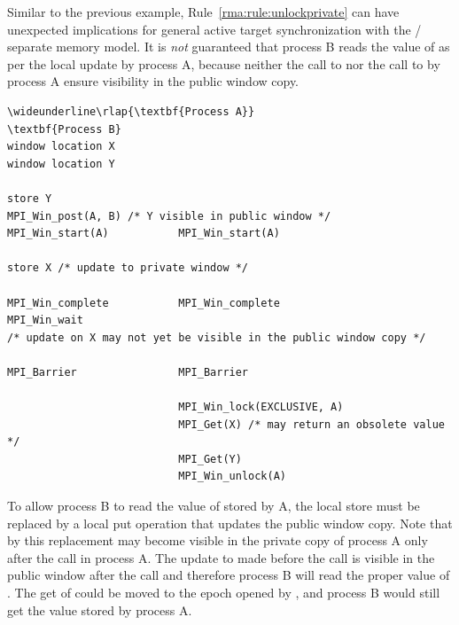 \begin{example}
%
Similar to the previous example, Rule~\ref{rma:rule:unlockprivate} can
have unexpected implications for general active target synchronization
with the \RMA/ separate memory model.  It is \emph{not} guaranteed
that process B reads the value of  as per the local update by process
A, because neither the call to  nor
the call to  by process A ensure visibility in
the public window copy.
\begin{Verbatim}[commandchars=\\\{\}]
\wideunderline\rlap{\textbf{Process A}}                           \textbf{Process B}
window location X
window location Y

store Y
MPI_Win_post(A, B) /* Y visible in public window */
MPI_Win_start(A)           MPI_Win_start(A)

store X /* update to private window */

MPI_Win_complete           MPI_Win_complete
MPI_Win_wait
/* update on X may not yet be visible in the public window copy */

MPI_Barrier                MPI_Barrier

                           MPI_Win_lock(EXCLUSIVE, A)
                           MPI_Get(X) /* may return an obsolete value */ 
                           MPI_Get(Y)
                           MPI_Win_unlock(A)
\end{Verbatim}
\lstset{fancyvrb=false}
To allow process B to read the value of  stored by A, the local store must be
replaced by a local put operation that updates the public window
copy.  Note that by this replacement  may become visible in the
private copy of process A only after the
 call in process A.  The update to  made
before the  call is visible in the public
window after the  call and therefore process B
will read the proper value of .  The get of  could
be moved to the epoch opened by ,
and process B would still get the value stored by process A.
\end{example}

